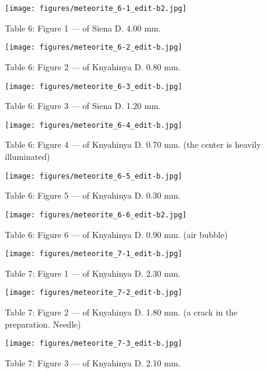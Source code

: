 \documentclass[a4paper, 12pt, oneside]{article}
\begin{document}
\clearpage
\begin{figure}[t]
\texttt{[image: figures/meteorite\_6-1\_edit-b2.jpg]}
\caption{Table 6: Figure 1 --- of Siena D. 4.00 mm.}
\centering
\end{figure}
\clearpage
\begin{figure}[t]
\texttt{[image: figures/meteorite\_6-2\_edit-b.jpg]}
\caption{Table 6: Figure 2 --- of Knyahinya D. 0.80 mm.}
\centering
\end{figure}
\clearpage
\begin{figure}[t]
\texttt{[image: figures/meteorite\_6-3\_edit-b.jpg]}
\caption{Table 6: Figure 3 --- of Siena D. 1.20 mm.}
\centering
\end{figure}
\clearpage
\begin{figure}[t]
\texttt{[image: figures/meteorite\_6-4\_edit-b.jpg]}
\caption{Table 6: Figure 4 --- of Knyahinya D. 0.70 mm. (the center is heavily illuminated)}
\centering
\end{figure}
\clearpage
\begin{figure}[t]
\texttt{[image: figures/meteorite\_6-5\_edit-b.jpg]}
\caption{Table 6: Figure 5 --- of Knyahinya D. 0.30 mm.}
\centering
\end{figure}
\clearpage
\begin{figure}[t]
\texttt{[image: figures/meteorite\_6-6\_edit-b2.jpg]}
\caption{Table 6: Figure 6 --- of Knyahinya D. 0.90 mm. (air bubble)}
\centering
\end{figure}
\clearpage
{}
\begin{figure}[t]
\texttt{[image: figures/meteorite\_7-1\_edit-b.jpg]}
\caption{Table 7: Figure 1 --- of Knyahinya D. 2.30 mm.}
\centering
\end{figure}
\clearpage
\begin{figure}[t]
\texttt{[image: figures/meteorite\_7-2\_edit-b.jpg]}
\caption{Table 7: Figure 2 --- of Knyahinya D. 1.80 mm. (a crack in the preparation. Needle)}
\centering
\end{figure}
\clearpage
\begin{figure}[t]
\texttt{[image: figures/meteorite\_7-3\_edit-b.jpg]}
\caption{Table 7: Figure 3 --- of Knyahinya D. 2.10 mm.}
\centering
\end{figure}
\end{document}
